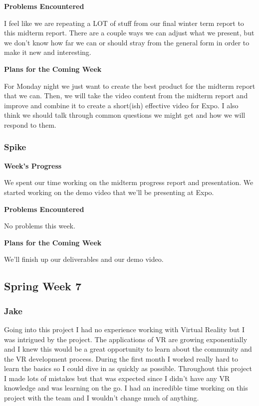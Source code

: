 \documentclass[10pt,journal,compsoc,onecolumn, draftclsnofoot]{IEEEtran}
\begin{document}
\noindent \textbf{Problems Encountered}

I feel like we are repeating a LOT of stuff from our final winter term report to this midterm report. There are a couple ways we can adjust what we present, but we don't know how far we can or should stray from the general form in order to make it new and interesting.

\noindent \textbf{Plans for the Coming Week}

For Monday night we just want to create the best product for the midterm report that we can. Then, we will take the video content from the midterm report and improve and combine it to create a short(ish) effective video for Expo. I also think we should talk through common questions we might get and how we will respond to them.

\subsubsection{Spike}
\noindent \textbf{Week's Progress}

We spent our time working on the midterm progress report and presentation. We started working on the demo video that we'll be presenting at Expo.

\noindent \textbf{Problems Encountered}

No problems this week.

\noindent \textbf{Plans for the Coming Week}

We'll finish up our deliverables and our demo video.

\subsection{Spring Week 7}
\subsubsection{Jake}

Going into this project I had no experience working with Virtual Reality but I was intrigued by the project. The applications of VR are growing exponentially and I knew this would be a great opportunity to learn about the community and the VR development process. During the first month I worked really hard to learn the basics so I could dive in as quickly as possible. Throughout this project I made lots of mistakes but that was expected since I didn't have any VR knowledge and was learning on the go. I had an incredible time working on this project with the team and I wouldn't change much of anything.
\end{document}
